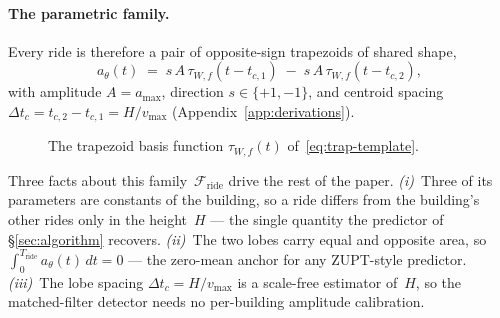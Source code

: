 \documentclass[manuscript,review,screen]{acmart}
\begin{document}
\paragraph{The parametric family.}
Every ride is therefore a pair of opposite-sign trapezoids of
shared shape,
\begin{equation}
  a_\theta(t)
  \;=\; s\,A\,\tau_{W,f}(t-t_{c,1})
        \;-\; s\,A\,\tau_{W,f}(t-t_{c,2}),
  \label{eq:ride-template}
\end{equation}
with amplitude $A\!=\!a_{\max}$, direction $s\!\in\!\{+1,-1\}$, and
centroid spacing $\Delta t_c\!=\!t_{c,2}-t_{c,1}\!=\!H/v_{\max}$
(Appendix~\ref{app:derivations}).

\begin{figure}
  \vspace{-0.6em}
  \centering
  \caption{The trapezoid basis function $\tau_{W,f}(t)$
    of~\eqref{eq:trap-template}.}
  \label{fig:trap-template}
  \vspace{-0.5em}
\end{figure}
Three facts about this family~$\mathcal{F}_{\text{ride}}$ drive
the rest of the paper.
\emph{(i)}~Three of its parameters are constants of the building, so
a ride differs from the building's other rides only in the
height~$H$ --- the single quantity the predictor of
\S\ref{sec:algorithm} recovers.  \emph{(ii)}~The two lobes carry
equal and opposite area, so
$\int_0^{T_{\text{ride}}}a_\theta(t)\,dt\!=\!0$ --- the zero-mean
anchor for any ZUPT-style predictor.  \emph{(iii)}~The lobe
spacing $\Delta t_c\!=\!H/v_{\max}$ is a scale-free estimator
of~$H$, so the matched-filter detector needs no per-building
amplitude calibration.
\end{document}
